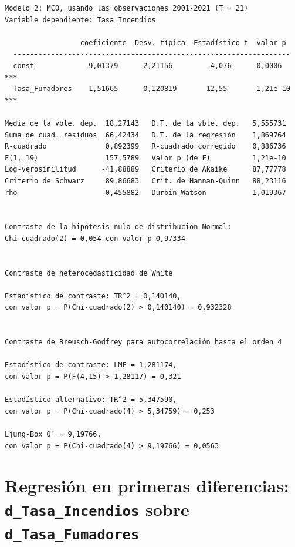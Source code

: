 \documentclass[10pt]{article}
\begin{document}
{\footnotesize
\begin{verbatim}
Modelo 2: MCO, usando las observaciones 2001-2021 (T = 21)
Variable dependiente: Tasa_Incendios

                  coeficiente  Desv. típica  Estadístico t  valor p 
  ------------------------------------------------------------------
  const            -9,01379      2,21156        -4,076      0,0006   ***
  Tasa_Fumadores    1,51665      0,120819       12,55       1,21e-10 ***

Media de la vble. dep.  18,27143   D.T. de la vble. dep.   5,555731
Suma de cuad. residuos  66,42434   D.T. de la regresión    1,869764
R-cuadrado              0,892399   R-cuadrado corregido    0,886736
F(1, 19)                157,5789   Valor p (de F)          1,21e-10
Log-verosimilitud      -41,88889   Criterio de Akaike      87,77778
Criterio de Schwarz     89,86683   Crit. de Hannan-Quinn   88,23116
rho                     0,455882   Durbin-Watson           1,019367


Contraste de la hipótesis nula de distribución Normal:
Chi-cuadrado(2) = 0,054 con valor p 0,97334


Contraste de heterocedasticidad de White

Estadístico de contraste: TR^2 = 0,140140,
con valor p = P(Chi-cuadrado(2) > 0,140140) = 0,932328


Contraste de Breusch-Godfrey para autocorrelación hasta el orden 4

Estadístico de contraste: LMF = 1,281174,
con valor p = P(F(4,15) > 1,28117) = 0,321

Estadístico alternativo: TR^2 = 5,347590,
con valor p = P(Chi-cuadrado(4) > 5,34759) = 0,253

Ljung-Box Q' = 9,19766,
con valor p = P(Chi-cuadrado(4) > 9,19766) = 0,0563
\end{verbatim}
}
\section*{Regresión en primeras diferencias: \texttt{d\_Tasa\_Incendios} sobre \texttt{d\_Tasa\_Fumadores}}
\label{sec:org229f929}
\end{document}
